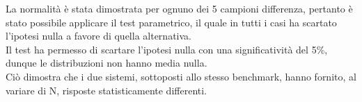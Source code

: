 La normalità è stata dimostrata per ognuno dei 5 campioni differenza, pertanto è stato possibile applicare il test parametrico, il quale in tutti i casi ha scartato l'ipotesi nulla a favore di quella alternativa.
\\
Il test ha permesso di scartare l'ipotesi nulla con una significatività del 5\%, dunque le distribuzioni non hanno media nulla.
\\
Ciò dimostra che i due sistemi, sottoposti allo stesso benchmark, hanno fornito, al variare di N, risposte statisticamente differenti.  